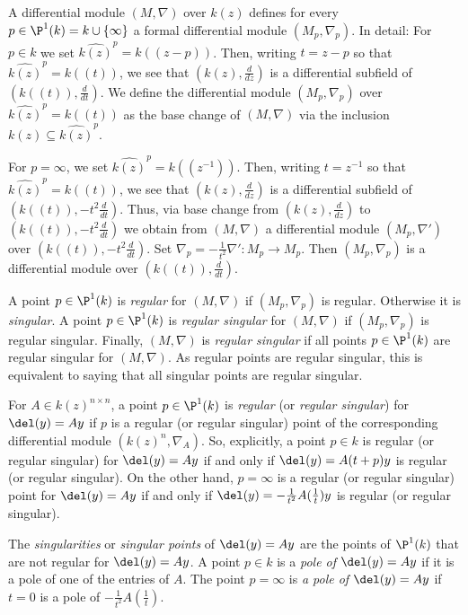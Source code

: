 \documentclass[a4paper, 11pt]{article}
\begin{document}
A differential module $(M,\nabla)$ over $k(z)$ defines for every $p\in\P^1(k)=k\cup\{\infty\}$ a formal differential module $(M_p,\nabla_p)$. In detail: For $p\in k$ we set $\widehat{k(z)}^p=k((z-p))$. Then, writing $t=z-p$ so that $\widehat{k(z)}^p=k((t))$, we see that $(k(z),\frac{d}{dz})$ is a differential subfield of $(k((t)),\frac{d}{dt})$. We define the differential module $(M_p,\nabla_p)$ over $\widehat{k(z)}^p=k((t))$ as the base change of $(M,\nabla)$ via the inclusion $k(z)\subseteq \widehat{k(z)}^p$. 

For $p=\infty$, we set $\widehat{k(z)}^p=k((z^{-1}))$. Then, writing $t=z^{-1}$ so that $\widehat{k(z)}^p=k((t))$, we see that $(k(z),\frac{d}{dz})$ is a differential subfield of $(k((t)),-t^2\frac{d}{dt})$. Thus, via base change from  $(k(z),\frac{d}{dz})$ to $(k((t)),-t^2\frac{d}{dt})$ we obtain from $(M, \nabla)$ a differential module $(M_p,\nabla')$ over  $(k((t)),-t^2\frac{d}{dt})$. Set $\nabla_p=-\frac{1}{t^2}\nabla'\colon M_p\to M_p$. Then $(M_p,\nabla_p)$ is a differential module over $(k((t)),\frac{d}{dt})$. 

A point $p\in\P^1(k)$ is \emph{regular} for $(M,\nabla)$ if $(M_p,\nabla_p)$ is regular. Otherwise it is \emph{singular}. A point $p\in\P^1(k)$ is \emph{regular singular} for $(M,\nabla)$ if $(M_p,\nabla_p)$ is regular singular. Finally, $(M,\nabla)$ is \emph{regular singular} if all points $p\in\P^1(k)$ are regular singular for $(M,\nabla)$. As regular points are regular singular, this is equivalent to saying that all singular points are regular singular. 

For $A\in k(z)^{n\times n}$, a point $p\in \P^1(k)$ is \emph{regular} (or \emph{regular singular}) for $\del(y)=Ay$ if $p$ is a regular (or regular singular) point of the corresponding differential module $(k(z)^n,\nabla_A)$. 
So, explicitly, a point $p\in k$ is regular (or regular singular) for $\del(y)=Ay$ if and only if $\del(y)=A(t+p)y$ is regular (or regular singular). On the other hand, $p=\infty$ is a regular (or regular singular) point for $\del(y)=Ay$ if and only if $\del(y)=-\frac{1}{t^2}A(\frac{1}{t})y$ is regular (or regular singular).



The \emph{singularities} or \emph{singular points} of $\del(y)=Ay$ are the points of $\P^1(k)$ that are not regular for $\del(y)=Ay$. A point $p\in k$ is a \emph{pole of $\del(y)=Ay$} if it is a pole of one of the entries of $A$. The point $p=\infty$ is \emph{a pole of $\del(y)=Ay$} if $t=0$ is a pole of $-\frac{1}{t^2}A(\frac{1}{t})$.
\end{document}
